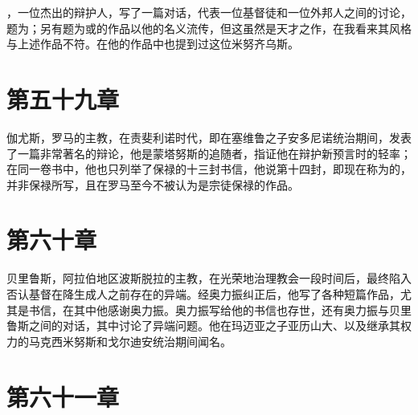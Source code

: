 ，一位杰出的辩护人，写了一篇对话，代表一位基督徒和一位外邦人之间的讨论，题为；另有题为或的作品以他的名义流传，但这虽然是天才之作，在我看来其风格与上述作品不符。在他的作品中也提到过这位米努齐乌斯。\par


\section{第五十九章}

伽尤斯，罗马的主教，在责斐利诺时代，即在塞维鲁之子安多尼诺统治期间，发表了一篇非常著名的辩论，他是蒙塔努斯的追随者，指证他在辩护新预言时的轻率；在同一卷书中，他也只列举了保禄的十三封书信，他说第十四封，即现在称为的，并非保禄所写，且在罗马至今不被认为是宗徒保禄的作品。\par


\section{第六十章}

贝里鲁斯，阿拉伯地区波斯脱拉的主教，在光荣地治理教会一段时间后，最终陷入否认基督在降生成人之前存在的异端。经奥力振纠正后，他写了各种短篇作品，尤其是书信，在其中他感谢奥力振。奥力振写给他的书信也存世，还有奥力振与贝里鲁斯之间的对话，其中讨论了异端问题。他在玛迈亚之子亚历山大、以及继承其权力的马克西米努斯和戈尔迪安统治期间闻名。\par


\section{第六十一章}

